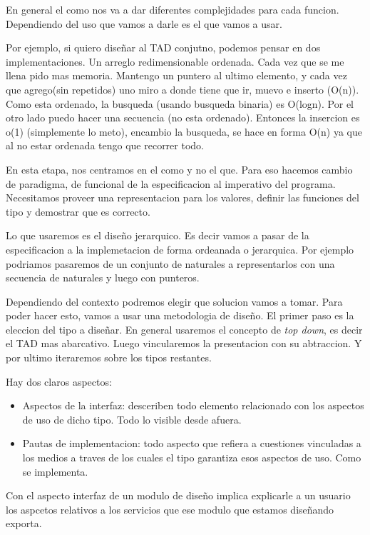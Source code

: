 \documentclass[11pt]{article}
\begin{document}
En general el como nos va a dar diferentes complejidades para cada funcion.
Dependiendo del uso que vamos a darle es el que vamos a usar.

Por ejemplo, si quiero diseñar al TAD conjutno, podemos pensar en dos implementaciones.
Un arreglo redimensionable ordenada. Cada vez que se me llena pido mas memoria.
Mantengo un puntero al ultimo elemento, y cada vez que agrego(sin repetidos)
uno miro a donde tiene que ir, muevo e inserto (O(n)).
Como esta ordenado, la busqueda (usando busqueda binaria) es O(logn).
Por el otro lado puedo hacer una secuencia (no esta ordenado).
Entonces la insercion es o(1) (simplemente lo meto), encambio la busqueda,
se hace en forma O(n) ya que al no estar ordenada tengo que recorrer todo.

En esta etapa, nos centramos en el como y no el que.
Para eso hacemos cambio de paradigma, de funcional de la especificacion al imperativo
del programa.
Necesitamos proveer una representacion para los valores, definir las funciones del
tipo y demostrar que es correcto.

Lo que usaremos es el dise\~no jerarquico.
Es decir vamos a pasar de la especificacion a la implemetacion de forma ordeanada
o jerarquica.
Por ejemplo podriamos pasaremos de un conjunto de naturales a representarlos
con una secuencia de naturales y luego con punteros.

Dependiendo del contexto podremos elegir que solucion vamos a tomar.
Para poder hacer esto, vamos a usar una metodologia de dise\~no.
El primer paso es la eleccion del tipo a dise\~nar.
En general usaremos el concepto de \textit{top down}, es decir el TAD mas abarcativo.
Luego vincularemos la presentacion con su abtraccion.
Y por ultimo iteraremos sobre los tipos restantes.

Hay dos claros aspectos:
\begin{itemize}
    \item Aspectos de la interfaz: desceriben todo elemento relacionado con los aspectos
        de uso de dicho tipo.
        Todo lo visible desde afuera.
    \item Pautas de implementacion: todo aspecto que refiera a cuestiones vinculadas
        a los medios a traves de los cuales el tipo garantiza esos aspectos de uso.
        Como se implementa.
\end{itemize}

Con el aspecto interfaz de un modulo de dise\~no implica explicarle a un usuario
los aspcetos relativos a los servicios que ese modulo que estamos dise\~nando exporta.
\end{document}
